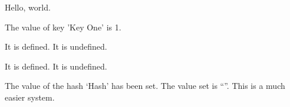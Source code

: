 \documentclass[12pt]{WisconsinThesis}
\begin{document}
    

Hello, world.


 {The value of key 'Key One' is 1.}

    {It is defined.}
    {It is undefined.}


    {It is defined.}
    {It is undefined.}

The value of the hash `Hash' has been set.  The value set is ``''.  This is a much easier system.

%
%
%
%
%
\end{document}
